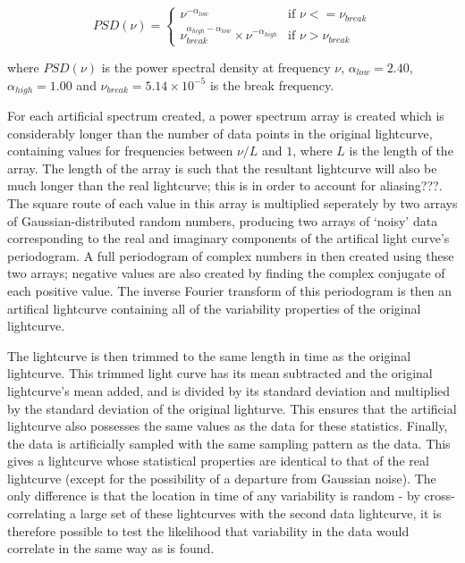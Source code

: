 \documentclass[letters,useAMS,usenatbib]{samnote}
\begin{document}
\begin{equation}
PSD(\nu) =
\begin{cases}
\nu^{-\alpha_{low}} & \text{if } \nu <= \nu_{break}
\\
\nu_{break}^{\alpha_{high}-\alpha_{low}}\times \nu^{-\alpha_{high}}  & \text{if } \nu > \nu_{break}
\end{cases}
\end{equation}

where $PSD(\nu)$ is the power spectral density at frequency $\nu$, $\alpha_{low}  = 2.40$, $\alpha_{high} = 1.00$ and $\nu_{break} = 5.14\times10^{-5}$ is the break
frequency.

For each artificial spectrum created, a power spectrum array is created which is considerably longer than the number of data points in the original lightcurve,
containing values for frequencies between $\nu/L$ and $1$, where $L$ is the length of the array. The length of the array is such that the resultant lightcurve will
also be much longer than the real lightcurve;  this is in order to account for aliasing???. The square route of each value in this array is multiplied seperately by two
arrays of Gaussian-distributed random numbers, producing two arrays of `noisy' data corresponding to the real and imaginary components of the artifical light curve's
periodogram. A full periodogram of complex numbers in then created using these two arrays; negative values are also created by finding the complex conjugate of each
positive value. The inverse Fourier transform of this periodogram is then an artifical lightcurve containing all of the variability properties of the original lightcurve.

The lightcurve is then trimmed to the same length in time as the original lightcurve. This trimmed light curve has its mean subtracted and the original lightcurve's mean
added, and is divided by its standard deviation and multiplied by the standard deviation of the original lighturve. This ensures that the artificial lightcurve also
possesses the same values as the data for these statistics. Finally, the data is artificially sampled with the same sampling pattern as the data. This gives a lightcurve
whose statistical properties are identical to that of the real lightcurve (except for the possibility of a departure from Gaussian noise). The only difference is that
the location in time of any variability is random - by cross-correlating a large set of these lightcurves with the second data lightcurve, it is therefore possible to
test the likelihood that variability in the data would correlate in the same way as is found.
\end{document}
